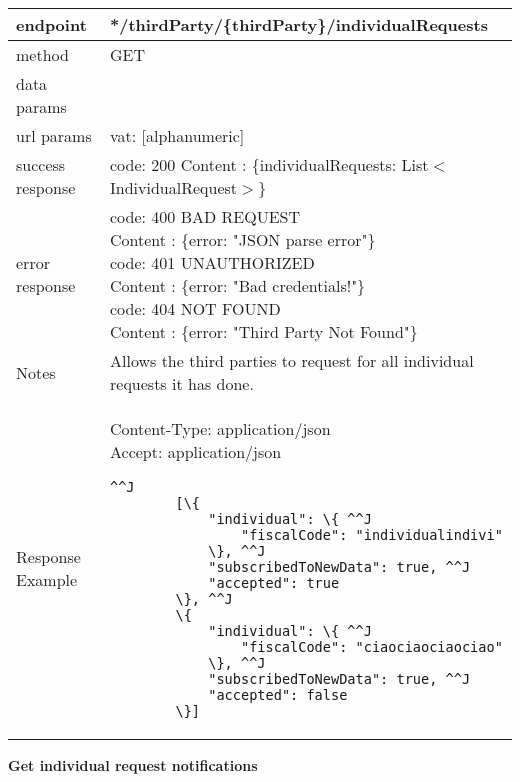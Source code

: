 	\begin{tabularx}{\linewidth}{| l| l }
		\hline
		endpoint & */thirdParty/\{thirdParty\}/individualRequests \\
		\hline
		method & GET \\
		\hline
		data params & \\
		\hline
		url params &
		\parbox{0.7\textwidth}{
			\bigskip
			vat: [alphanumeric]
			\bigskip
		} \\
		\hline
		success response &
		\parbox{0.7\textwidth}{
			\bigskip
			code: 200\\
			Content : \{individualRequests: List$<$IndividualRequest$>$\}
			\bigskip
		} \\
		\hline
		error response &
		\parbox{0.7\textwidth}{
			\bigskip
			code: 400 BAD REQUEST \\
			Content : \{error: "JSON parse error"\}\\
			code: 401 UNAUTHORIZED \\
			Content : \{error: "Bad credentials!"\}\\
			code: 404 NOT FOUND \\
			Content : \{error: "Third Party Not Found"\}
			\bigskip
		} \\
		\hline
		Notes & 
		\parbox{0.7\textwidth}{
			\bigskip Allows the third parties to request for all individual requests it has done.
		\bigskip}  \\
		\hline
		Response Example & 
		\parbox{0.8\textwidth}{
		\bigskip
		Content-Type: application/json \\
		Accept: application/json \\
		\bigskip
		\begin{lstlisting}^^J
		[\{
			"individual": \{ ^^J
				"fiscalCode": "individualindivi"
			\}, ^^J
			"subscribedToNewData": true, ^^J
			"accepted": true
		\}, ^^J
		\{
			"individual": \{ ^^J
				"fiscalCode": "ciaociaociaociao"
			\}, ^^J
			"subscribedToNewData": true, ^^J
			"accepted": false
		\}]
	\end{lstlisting}
	} \\
	\hline
	\end{tabularx}
	
	\textbf{Get individual request notifications} \\

